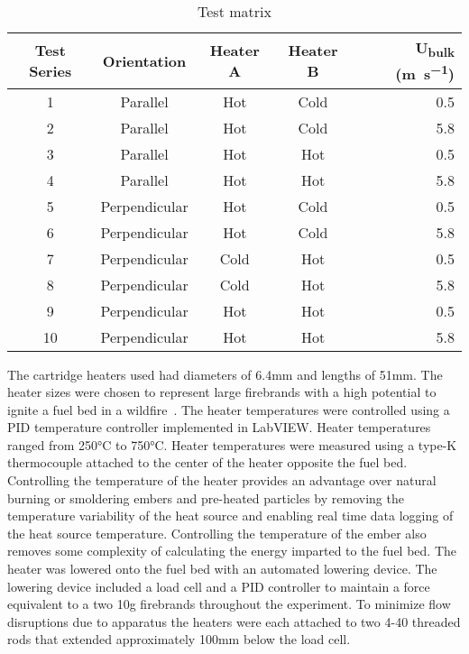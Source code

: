         \begin{table}[hpbt]
            \normalsize
            \caption{Test matrix}
            \centering
            \begin{tabular}{ccccr}
                \rowcolor{gray!50}
               Test Series & Orientation & Heater A & Heater B & U\textsubscript{bulk} (\si{\meter\per\second})\\
                \hline
                1   & Parallel      & Hot  & Cold & 0.5 \\
                2   & Parallel      & Hot  & Cold & 5.8 \\
                3   & Parallel      & Hot  & Hot  & 0.5 \\
                4   & Parallel      & Hot  & Hot  & 5.8 \\
                5   & Perpendicular & Hot  & Cold & 0.5 \\
                6   & Perpendicular & Hot  & Cold & 5.8 \\
                7   & Perpendicular & Cold & Hot  & 0.5 \\
                8   & Perpendicular & Cold & Hot  & 5.8 \\
                9   & Perpendicular & Hot  & Hot  & 0.5 \\
                10  & Perpendicular & Hot  & Hot  & 5.8 
            \end{tabular}
            \label{tab:multiHeaterConfig}
        \end{table}
    
    The cartridge heaters used had diameters of 6.4\si{\milli\meter} and lengths of 51\si{\milli\meter}. The heater sizes were chosen to represent large firebrands with a high potential to ignite a fuel bed in a wildfire~\cite{Manzello2007}. The heater temperatures were controlled using a PID temperature controller implemented in LabVIEW. Heater temperatures ranged from 250\si{\celsius} to 750\si{\celsius}. Heater temperatures were measured using a type-K thermocouple attached to the center of the heater opposite the fuel bed.
    Controlling the temperature of the heater provides an advantage over natural burning or smoldering embers and pre-heated particles by removing the temperature variability of the heat source and enabling real time data logging of the heat source temperature. Controlling the temperature of the ember also removes some complexity of calculating the energy imparted to the fuel bed. The heater was lowered onto the fuel bed with an automated lowering device. The lowering device included a load cell and a PID controller to maintain a force equivalent to a two 10\si{\gram} firebrands throughout the experiment. To minimize flow disruptions due to apparatus the heaters were each attached to two 4-40 threaded rods that extended approximately 100\si{\milli\meter} below the load cell. 
    
